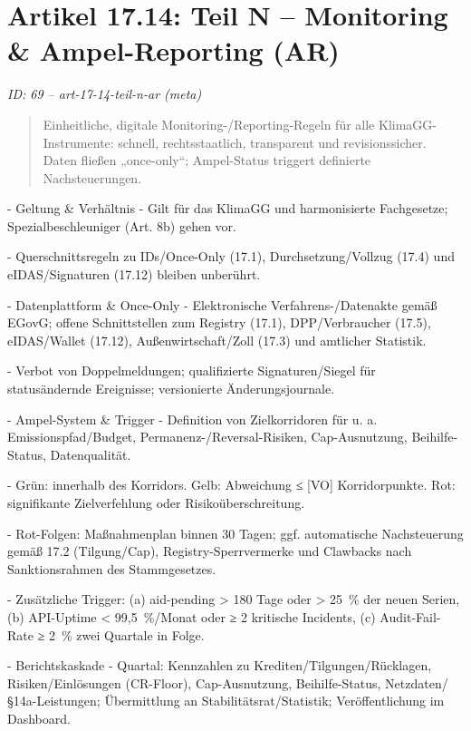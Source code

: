 \documentclass[12pt,a4paper]{scrartcl}
\begin{document}
\section[Artikel 17.14: Teil N -- Monitoring \& Ampel-Reporting (AR)]{Artikel 17.14: Teil N -- Monitoring \& Ampel-Reporting (AR)}
\noindent\textit{ID: 69 -- art-17-14-teil-n-ar (meta)}

\begin{quote}
Einheitliche, digitale Monitoring-/Reporting-Regeln für alle KlimaGG-Instrumente: schnell, rechtsstaatlich, transparent und revisionssicher. Daten fließen „once-only“; Ampel-Status triggert definierte Nachsteuerungen.
\end{quote}

- Geltung \& Verhältnis
- Gilt für das KlimaGG und harmonisierte Fachgesetze; Spezialbeschleuniger (Art. 8b) gehen vor.

- Querschnittsregeln zu IDs/Once-Only (17.1), Durchsetzung/Vollzug (17.4) und eIDAS/Signaturen (17.12) bleiben unberührt.

- Datenplattform \& Once-Only
- Elektronische Verfahrens-/Datenakte gemäß EGovG; offene Schnittstellen zum Registry (17.1), DPP/Verbraucher (17.5), eIDAS/Wallet (17.12), Außenwirtschaft/Zoll (17.3) und amtlicher Statistik.

- Verbot von Doppelmeldungen; qualifizierte Signaturen/Siegel für statusändernde Ereignisse; versionierte Änderungsjournale.

- Ampel-System \& Trigger
- Definition von Zielkorridoren für u. a. Emissionspfad/Budget, Permanenz-/Reversal-Risiken, Cap-Ausnutzung, Beihilfe-Status, Datenqualität.

- Grün: innerhalb des Korridors. Gelb: Abweichung ≤ [VO] Korridorpunkte. Rot: signifikante Zielverfehlung oder Risikoüberschreitung.

- Rot-Folgen: Maßnahmenplan binnen 30 Tagen; ggf. automatische Nachsteuerung gemäß 17.2 (Tilgung/Cap), Registry-Sperrvermerke und Clawbacks nach Sanktionsrahmen des Stammgesetzes.

- Zusätzliche Trigger: (a) aid-pending > 180 Tage oder > 25 \% der neuen Serien, (b) API-Uptime < 99,5 \%/Monat oder ≥ 2 kritische Incidents, (c) Audit-Fail-Rate ≥ 2 \% zwei Quartale in Folge.

- Berichtskaskade
- Quartal: Kennzahlen zu Krediten/Tilgungen/Rücklagen, Risiken/Einlösungen (CR-Floor), Cap-Ausnutzung, Beihilfe-Status, Netzdaten/§14a-Leistungen; Übermittlung an Stabilitätsrat/Statistik; Veröffentlichung im Dashboard.
\end{document}
